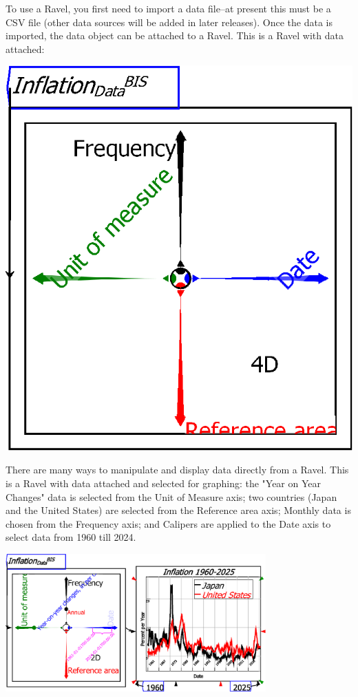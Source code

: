 To use a Ravel, you first need to import a data file--at present
this must be a CSV file (other data sources will be added in later
releases). Once the data is imported, the data object can be attached
to a Ravel. This is a Ravel with data attached:
\begin{flushleft}
\includegraphics{images/01RavelDataInflation} 
\par\end{flushleft}

There are many ways to manipulate and display data directly from a
Ravel. This is a Ravel with data attached and selected for graphing:
the "Year on Year Changes" data is selected from the Unit of Measure
axis; two countries (Japan and the United States) are selected from
the Reference area axis; Monthly data is chosen from the Frequency
axis; and Calipers are applied to the Date axis to select data from
1960 till 2024.

\includegraphics[width=10cm]{images/01BRavelDataInflationSelected}

